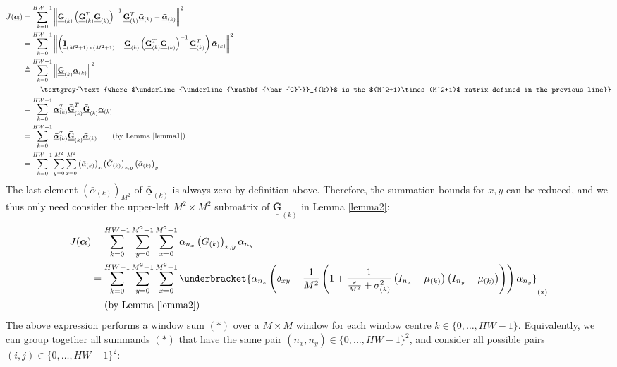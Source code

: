 \documentclass{article}
\def\vts#1{\underline{\boldsymbol{#1}}}
\def\mt#1{\underline{\underline{\mathbf{#1}}}}
\begin{document}
\begin{align*}
    J(\vts\alpha) &=  \sum_{k=0}^{HW-1} \left\| \mt G_{(k)}\left(\mt G_{(k)}^T \mt G_{(k)} \right)^{-1} \mt G_{(k)}^T \vts{\bar{\alpha}}_{(k)}  - \vts{\bar{\alpha}}_{(k)} \right\|^2\\
    &=  \sum_{k=0}^{HW-1} \left\| \left(\mt I_{(M^2+1)\times(M^2+1)} -  \mt G_{(k)}\left(\mt G_{(k)}^T \mt G_{(k)} \right)^{-1} \mt G_{(k)}^T \right) \vts{\bar{\alpha}}_{(k)}   \right\|^2\\
    &\triangleq  \sum_{k=0}^{HW-1} \left\| \mt{\bar{G}}_{(k)} \vts{\bar{\alpha}}_{(k)}   \right\|^2\\
    &\quad\quad\ \textgrey{\text{where $\mt{\bar{G}}_{(k)}$ is the $(M^2+1)\times(M^2+1)$ matrix defined in the previous line}}\\
    &= \sum_{k=0}^{HW-1} \vts{\bar{\alpha}}_{(k)}^T \mt{\bar{G}}_{(k)}^T \mt{\bar{G}}_{(k)} \vts{\bar{\alpha}}_{(k)}\\
    &= \sum_{k=0}^{HW-1} \vts{\bar{\alpha}}_{(k)}^T  \mt{\bar{G}}_{(k)} \vts{\bar{\alpha}}_{(k)} \qquad\text{(by Lemma \ref{lemma1})}\\
    &= \sum_{k=0}^{HW-1} \sum_{y=0}^{M^2} \sum_{x=0}^{M^2} \left({\bar{\alpha}}_{(k)}\right)_x  \left({\bar{G}}_{(k)}\right)_{x,y} \left({\bar{\alpha}}_{(k)}\right)_y
\end{align*}
The last element $\left({\bar{\alpha}}_{(k)}\right)_{M^2}$ of $\vts{\bar{\alpha}}_{(k)}$ is always zero by definition above. Therefore, the summation bounds for $x,y$ can be reduced, and we thus only need consider the upper-left $M^2\times M^2$ submatrix of ${\mt{\bar{G}}}_{(k)}$ in Lemma \ref{lemma2}:
\begin{align*}
    J(\vts\alpha) &= \sum_{k=0}^{HW-1} \sum_{y=0}^{M^2-1} \sum_{x=0}^{M^2-1} \alpha_{n_x}  \left({\bar{G}}_{(k)}\right)_{x,y} \alpha_{n_y}\\
    &= \sum_{k=0}^{HW-1} \sum_{y=0}^{M^2-1} \sum_{x=0}^{M^2-1} \underbracket{\alpha_{n_x}  \left( \delta_{xy} - \frac1{M^2}\left(1 + \frac1{\frac\epsilon{M^2} + \sigma_{(k)}^2} \left({I}_{n_x} - \mu_{(k)}\right) \left({I}_{n_y} - \mu_{(k)}\right) \right) \right) \alpha_{n_y}}_{(*)}\\
    &\quad\ \text{(by Lemma \ref{lemma2})}
\end{align*}
The above expression performs a window sum $(*)$ over a $M\times M$ window for each window centre $k\in\{0,\dots,HW-1\}$. Equivalently, we can group together all summands $(*)$ that have the same pair $(n_x,n_y)\in\{0,\dots,HW-1\}^2$, and consider all possible pairs $(i,j)\in\{0,\dots,HW-1\}^2$:
\end{document}

